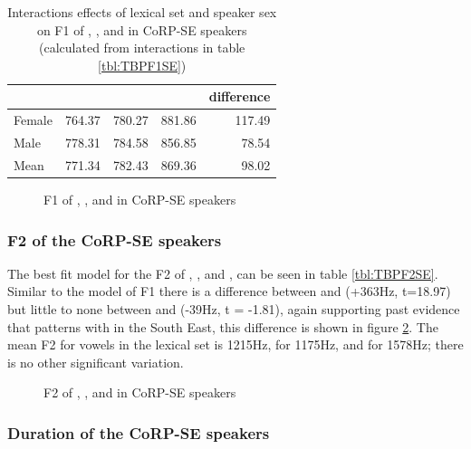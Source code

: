\documentclass[../../../00.FullDoc/tex/ThesisSkeleton-draft2]{subfiles}
\begin{document}
\begin{table}[htbp]
	\centering
	\begin{tabular}{lrrrr}
		\hline
		& \multicolumn{1}{l}{\bath{}} & \multicolumn{1}{l}{\palm{}} & \multicolumn{1}{l}{\trap{}} & \multicolumn{1}{l}{\TB{} difference} \\
		\hline
		Female & 764.37 & \cellcolor[rgb]{ .816,  .808,  .808} 780.27 & 881.86 & 117.49 \\
		Male  & 778.31 & \cellcolor[rgb]{ .816,  .808,  .808} 784.58 & 856.85 & 78.54 \\
		Mean  & 771.34 & \cellcolor[rgb]{ .816,  .808,  .808} 782.43 & 869.36 & 98.02 \\
		\hline
	\end{tabular}
	\caption{Interactions effects of lexical set and speaker sex on F1 of \trap{}, \bath{}, and \palm{} in CoRP-SE speakers (calculated from interactions in table \ref{tbl:TBPF1SE})}
	\label{tbl:TBPF1SE-inter}
\end{table}

\begin{figure}[h]
	
	\caption{F1 of \bath{}, \palm{}, and \trap{}  in CoRP-SE speakers} \label{fig:TBPF1SE}
\end{figure}

\subsubsection{F2 of the CoRP-SE speakers}
The best fit model for the F2 of \trap{}, \bath{}, and \palm{}, can be seen in table \ref{tbl:TBPF2SE}. Similar to the model of F1 there is a difference between \bath{} and \trap{} (+363Hz, t=18.97) but little to none between \bath{} and \palm{} (-39Hz, t = -1.81), again supporting past evidence that \bath{} patterns with \palm{} in the South East, this difference is shown in figure \ref{fig:TBPF2SE}. The mean F2 for vowels in the \bath{} lexical set is 1215Hz, for \palm{} 1175Hz, and for \trap{} 1578Hz; there is no other significant variation.



\begin{figure}[h]
	
	\caption{F2 of \bath{}, \palm{}, and \trap{}  in CoRP-SE speakers} \label{fig:TBPF2SE}
\end{figure}


\subsubsection{Duration of the CoRP-SE speakers}
\end{document}
